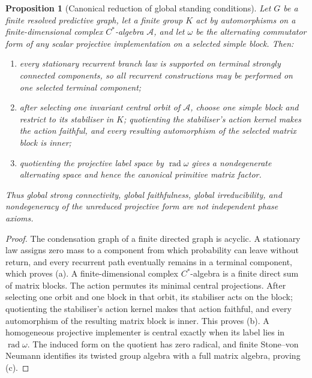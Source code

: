 \documentclass[11pt]{article}
\newtheorem{proposition}[theorem]{Proposition}
\theoremstyle{definition}
\theoremstyle{remark}
\newcommand{\rad}{\operatorname{rad}}
\begin{document}
\begin{proposition}[Canonical reduction of global standing conditions]
\label{prop:canonical-condition-reductions}
Let \(G\) be a finite resolved predictive graph, let a finite group \(K\) act by
automorphisms on a finite-dimensional complex \(C^*\)-algebra \(\mathcal A\),
and let \(\omega\) be the alternating commutator form of any scalar projective
implementation on a selected simple block.  Then:
\begin{enumerate}[label=\textup{(\alph*)},leftmargin=2.4em]
\item every stationary recurrent branch law is supported on terminal strongly
      connected components, so all recurrent constructions may be performed on
      one selected terminal component;
\item after selecting one invariant central orbit of \(\mathcal A\), choose
      one simple block and restrict to its stabiliser in \(K\); quotienting the
      stabiliser's action kernel makes the action faithful, and every resulting
      automorphism of the selected matrix block is inner;
\item quotienting the projective label space by \(\rad\omega\) gives a
      nondegenerate alternating space and hence the canonical primitive matrix
      factor.
\end{enumerate}
Thus global strong connectivity, global faithfulness, global irreducibility,
and nondegeneracy of the unreduced projective form are not independent phase
axioms.
\end{proposition}

\begin{proof}
The condensation graph of a finite directed graph is acyclic.  A stationary
law assigns zero mass to a component from which probability can leave without
return, and every recurrent path eventually remains in a terminal component,
which proves \textup{(a)}.  A finite-dimensional complex \(C^*\)-algebra is a
finite direct sum of matrix blocks.  The action permutes its minimal central
projections.  After selecting one orbit and one block in that orbit, its
stabiliser acts on the block; quotienting the stabiliser's action kernel makes
that action faithful, and every automorphism of the resulting matrix block is
inner.  This proves \textup{(b)}.  A homogeneous projective implementer is central exactly
when its label lies in \(\rad\omega\).  The induced form on the quotient has
zero radical, and finite Stone--von Neumann identifies its twisted group
algebra with a full matrix algebra, proving \textup{(c)}.
\end{proof}
\end{document}
